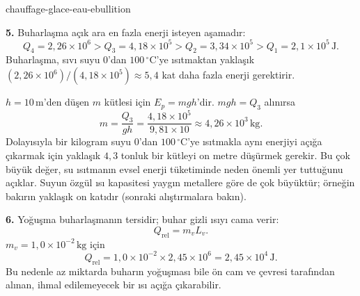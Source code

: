 \begin{exo}{chauffage-glace-eau-ebullition}
\begin{solution}
\textbf{5.} Buharlaşma açık ara en fazla enerji isteyen aşamadır:
\[
Q_4=2{,}26\times10^6>Q_3=4{,}18\times10^5>Q_2=3{,}34\times10^5>Q_1=2{,}1\times10^5\,\text{J}.
\]
Buharlaşma, sıvı suyu $0$'dan $100\,{}^\circ\text{C}$'ye ısıtmaktan yaklaşık $(2{,}26\times10^6)/(4{,}18\times10^5)\approx5{,}4$ kat daha fazla enerji gerektirir.

$h=10\,\text{m}$'den düşen $m$ kütlesi için $E_p=mgh$'dir. $mgh=Q_3$ alınırsa
\[
m=\frac{Q_3}{gh}=\frac{4{,}18\times10^5}{9{,}81\times10}
\approx4{,}26\times10^3\,\text{kg}.
\]
Dolayısıyla bir kilogram suyu $0$'dan $100\,{}^\circ\text{C}$'ye ısıtmakla aynı enerjiyi açığa çıkarmak için yaklaşık $4{,}3$ tonluk bir kütleyi on metre düşürmek gerekir. Bu çok büyük değer, su ısıtmanın evsel enerji tüketiminde neden önemli yer tuttuğunu açıklar. Suyun özgül ısı kapasitesi yaygın metallere göre de çok büyüktür; örneğin bakırın yaklaşık on katıdır (sonraki alıştırmalara bakın).

\textbf{6.} Yoğuşma buharlaşmanın tersidir; buhar gizli ısıyı cama verir:
\[
Q_{\text{rel}}=m_vL_v.
\]
$m_v=1{,}0\times10^{-2}\,\text{kg}$ için
\[
Q_{\text{rel}}=1{,}0\times10^{-2}\times2{,}45\times10^6
=2{,}45\times10^4\,\text{J}.
\]
Bu nedenle az miktarda buharın yoğuşması bile ön cam ve çevresi tarafından alınan, ihmal edilemeyecek bir ısı açığa çıkarabilir.
\end{solution}
\end{exo}

